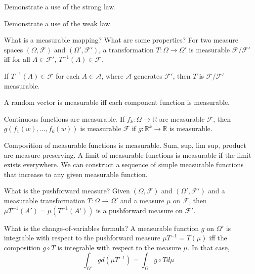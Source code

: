 \documentclass[avery5388,grid,frame]{flashcards}
\newcommand{\R}{\mathbb{R}}
\newcommand{\F}{\mathcal F}
\begin{document}
\begin{flashcard}
    {Demonstrate a use of the strong law.}
\end{flashcard}


\begin{flashcard}
    {Demonstrate a use of the weak law.}
\end{flashcard}


\begin{flashcard}
    {What is a measurable mapping? What are some properties?}
    For two measure spaces $(\Omega, \F)$ and $(\Omega', \F')$, a transformation $T: \Omega \rightarrow \Omega'$ is measurable $\F / \F'$ iff for all $A \in \F'$, $T^{-1}(A) \in \F$.

    If $T^{-1}(A) \in \F$ for each $A \in \mathcal A$, where $\mathcal A$ generates $\F'$, then $T$ is $\F / \F'$ measurable.

    A random vector is measurable iff each component function is measurable.

    Continuous functions are measurable. If $f_k: \Omega \rightarrow \R$ are measurable $\F$, then $g(f_1(w),\dots,f_k(w))$ is measurable $\F$ if $g: \R^k \rightarrow \R$ is measurable.

    Composition of measurable functions is measurable. Sum, sup, lim sup, product are measure-preserving. A limit of measurable functions is measurable if the limit exists everywhere. We can construct a sequence of simple measurable functions that increase to any given measurable function.
\end{flashcard}


\begin{flashcard}
    {What is the pushforward measure?}
    Given $(\Omega, \F)$ and $(\Omega',\F')$ and a measurable transformation $T:\Omega \rightarrow \Omega'$ and a measure $\mu$ on $\F$, then $\mu T^{-1}(A') = \mu (T^{-1}(A'))$ is a pushforward measure on $\F'$.
\end{flashcard}


\begin{flashcard}
    {What is the change-of-variables formula?}
    A measurable function $g$ on $\Omega'$ is integrable with respect to the pushforward measure $\mu T^{-1} = T(\mu)$ iff the composition $g \circ T$ is integrable with respect to the measure $\mu$. In that case,
    $$\int_{\Omega'} g d(\mu T^{-1}) = \int_{\Omega} g \circ T d\mu$$
\end{flashcard}
\end{document}
